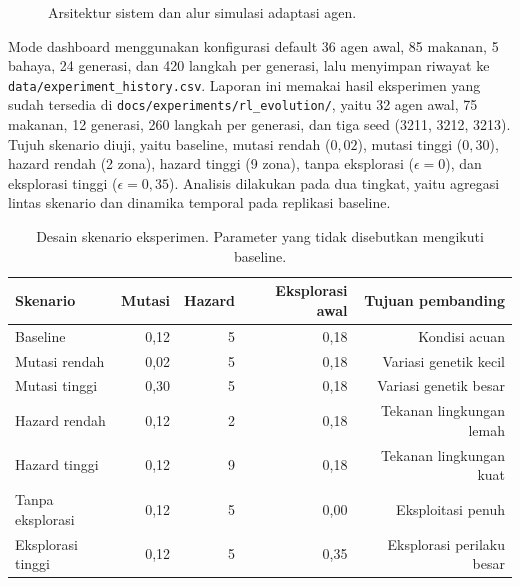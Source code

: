 \documentclass[10pt]{article}
\begin{document}
\begin{figure}[h]
\begin{minipage}[t]{0.47\textwidth}
\end{minipage}
\caption{Arsitektur sistem dan alur simulasi adaptasi agen.}
\label{fig:system-flow}
\end{figure}

Mode dashboard menggunakan konfigurasi default 36 agen awal, 85 makanan, 5 bahaya, 24 generasi, dan 420 langkah per generasi, lalu menyimpan riwayat ke \texttt{data/experiment\_history.csv}. Laporan ini memakai hasil eksperimen yang sudah tersedia di \texttt{docs/experiments/rl\_evolution/}, yaitu 32 agen awal, 75 makanan, 12 generasi, 260 langkah per generasi, dan tiga seed (3211, 3212, 3213). Tujuh skenario diuji, yaitu baseline, mutasi rendah ($0{,}02$), mutasi tinggi ($0{,}30$), hazard rendah (2 zona), hazard tinggi (9 zona), tanpa eksplorasi ($\epsilon=0$), dan eksplorasi tinggi ($\epsilon=0{,}35$). Analisis dilakukan pada dua tingkat, yaitu agregasi lintas skenario dan dinamika temporal pada replikasi baseline.

\begin{table}[h]
\centering
\caption{Desain skenario eksperimen. Parameter yang tidak disebutkan mengikuti baseline.}
\label{tab:desain}
\begin{tabular}{lrrrr}
\toprule
Skenario & Mutasi & Hazard & Eksplorasi awal & Tujuan pembanding \\
\midrule
Baseline & 0,12 & 5 & 0,18 & Kondisi acuan \\
Mutasi rendah & 0,02 & 5 & 0,18 & Variasi genetik kecil \\
Mutasi tinggi & 0,30 & 5 & 0,18 & Variasi genetik besar \\
Hazard rendah & 0,12 & 2 & 0,18 & Tekanan lingkungan lemah \\
Hazard tinggi & 0,12 & 9 & 0,18 & Tekanan lingkungan kuat \\
Tanpa eksplorasi & 0,12 & 5 & 0,00 & Eksploitasi penuh \\
Eksplorasi tinggi & 0,12 & 5 & 0,35 & Eksplorasi perilaku besar \\
\bottomrule
\end{tabular}
\end{table}
\end{document}
